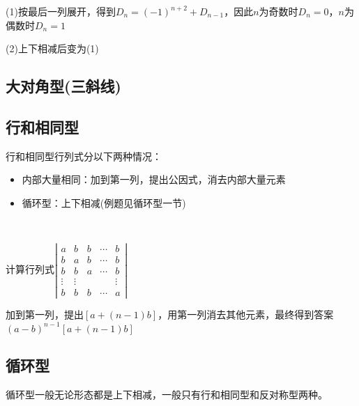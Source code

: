 \begin{solution}
  (1)按最后一列展开，得到$D_n = (-1)^{n+2} + D_{n-1}$，因此$n$为奇数时$D_n = 0$，$n$为偶数时$D_n = 1$

  (2)上下相减后变为(1)
\end{solution}

\subsection{大对角型(三斜线)}


\subsection{行和相同型}

\begin{theorem}[行和相同型]
  行和相同型行列式分以下两种情况：
  \begin{itemize}
  \item 内部大量相同：加到第一列，提出公因式，消去内部大量元素
  \item 循环型：上下相减(例题见循环型一节)
  \end{itemize}
\end{theorem}

~

\begin{exercise}[内部大量相同型]
  计算行列式$\left|
    \begin{array}{ccccc}
      a&b&b&\cdots&b \\
       b&a&b&\cdots&b \\
       b&b&a&\cdots&b \\
       \vdots&\vdots&&&\vdots \\
       b&b&b&\cdots&a
    \end{array}
  \right|$
\end{exercise}

\begin{solution}
  加到第一列，提出$[a + (n-1)b]$，用第一列消去其他元素，最终得到答案$(a-b)^{n-1}[a + (n-1)b]$
\end{solution}




\subsection{循环型}

循环型一般无论形态都是上下相减，一般只有行和相同型和反对称型两种。

